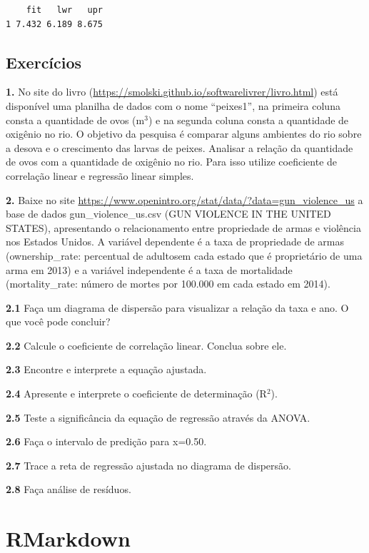 \documentclass[12pt,brazil,oneside]{book}
\begin{document}
\begin{verbatim}
    fit   lwr   upr
1 7.432 6.189 8.675
\end{verbatim}

\hypertarget{exercicios-4}{%
\section{Exercícios}\label{exercicios-4}}

\textbf{1.} No site do livro (\url{https://smolski.github.io/softwarelivrer/livro.html}) está disponível uma planilha de dados com o nome ``peixes1'', na primeira coluna consta a quantidade de ovos (m\(^3\)) e na segunda coluna consta a quantidade de oxigênio no rio. O objetivo da pesquisa é comparar alguns ambientes do rio sobre a desova e o crescimento das larvas de peixes. Analisar a relação da quantidade de ovos com a quantidade de oxigênio no rio. Para isso utilize coeficiente de correlação linear e regressão linear simples.

\textbf{2.} Baixe no site \url{https://www.openintro.org/stat/data/?data=gun_violence_us} a base de dados gun\_violence\_us.csv (GUN VIOLENCE IN THE UNITED STATES), apresentando o relacionamento entre propriedade de armas e violência nos Estados Unidos. A variável dependente é a taxa de propriedade de armas (ownership\_rate: percentual de adultosem cada estado que é proprietário de uma arma em 2013) e a variável independente é a taxa de mortalidade (mortality\_rate: número de mortes por 100.000 em cada estado em 2014).

\textbf{2.1} Faça um diagrama de dispersão para visualizar a relação da taxa e ano. O que você pode concluir?

\textbf{2.2} Calcule o coeficiente de correlação linear. Conclua sobre ele.

\textbf{2.3} Encontre e interprete a equação ajustada.

\textbf{2.4} Apresente e interprete o coeficiente de determinação (R\(^2\)).

\textbf{2.5} Teste a significância da equação de regressão através da ANOVA.

\textbf{2.6} Faça o intervalo de predição para x=0.50.

\textbf{2.7} Trace a reta de regressão ajustada no diagrama de dispersão.

\textbf{2.8} Faça análise de resíduos.

\hypertarget{rmark}{%
\chapter{RMarkdown}\label{rmark}}
\end{document}
